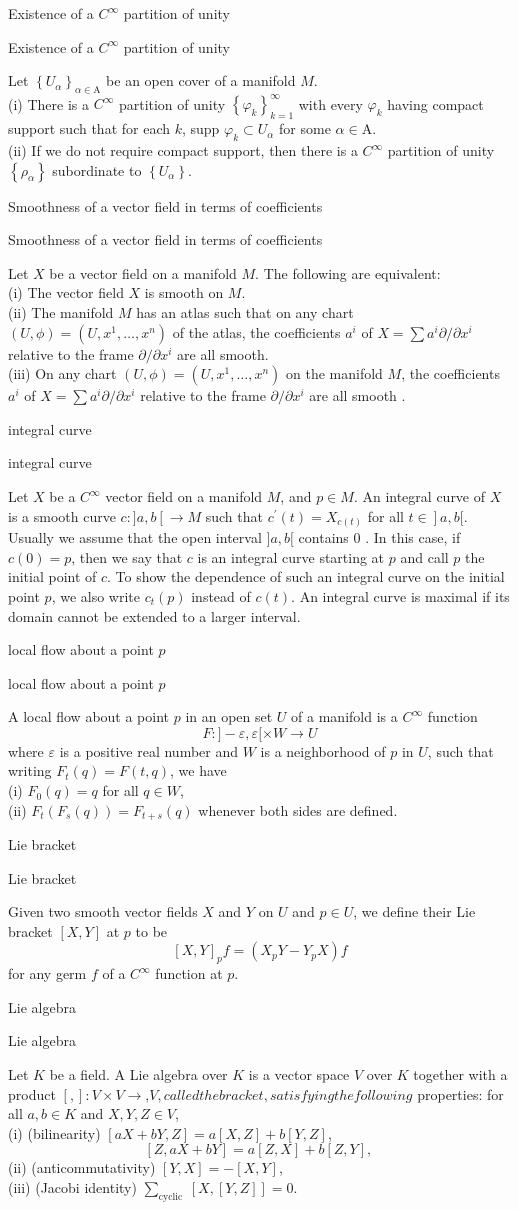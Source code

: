 \documentclass[17pt]{extarticle}
\newcommand{\boxset}[2]{\begin{mdframed}[style=darkQuesion]
#1
\end{mdframed}
\newpage
\begin{mdframed}[style=darkQuesion]
  #1
    \end{mdframed}
\begin{mdframed}[style=darkAnswer]
  #2
    \end{mdframed}
    \newpage
}
\begin{document}
\boxset{Existence of a $C^{\infty}$ partition of unity}
{Let $\left\{U_{\alpha}\right\}_{\alpha \in \mathrm{A}}$ be an open cover of a manifold $M$.\[\ \]
(i) There is a $C^{\infty}$ partition of unity $\left\{\varphi_{k}\right\}_{k=1}^{\infty}$ with every $\varphi_{k}$ having compact support such that for each $k$, supp $\varphi_{k} \subset U_{\alpha}$ for some $\alpha \in \mathrm{A}$.\[\ \]
(ii) If we do not require compact support, then there is a $C^{\infty}$ partition of unity $\left\{\rho_{\alpha}\right\}$ subordinate to $\left\{U_{\alpha}\right\}$.}
\boxset{Smoothness of a vector field in terms of coefficients}
{Let $X$ be a vector field on a manifold $M$. The following are equivalent:\[\ \]
(i) The vector field $X$ is smooth on $M$.\[\ \]
(ii) The manifold $M$ has an atlas such that on any chart $(U, \phi)=\left(U, x^{1}, \ldots, x^{n}\right)$ of the atlas, the coefficients $a^{i}$ of $X=\sum a^{i} \partial / \partial x^{i}$ relative to the frame $\partial / \partial x^{i}$ are all smooth.\[\ \]
(iii) On any chart $(U, \phi)=\left(U, x^{1}, \ldots, x^{n}\right)$ on the manifold $M$, the coefficients $a^{i}$ of $X=\sum a^{i} \partial / \partial x^{i}$ relative to the frame $\partial / \partial x^{i}$ are all smooth .}
\boxset{integral curve}
{Let $X$ be a $C^{\infty}$ vector field on a manifold $M$, and $p \in M$. An integral curve of $X$ is a smooth curve $c:] a, b\left[\rightarrow M\right.$ such that $c^{\prime}(t)=X_{c(t)}$ for all $\left.t \in\right] a, b[$. Usually we assume that the open interval $] a, b[$ contains 0 . In this case, if $c(0)=p$, then we say that $c$ is an integral curve starting at $p$ and call $p$ the initial point of $c$. To show the dependence of such an integral curve on the initial point $p$, we also write $c_{t}(p)$ instead of $c(t)$. An integral curve is maximal if its domain cannot be extended to a larger interval.}
\boxset{local flow about a point $p$}
{A local flow about a point $p$ in an open set $U$ of a manifold is a $C^{\infty}$ function
\[F:]-\varepsilon, \varepsilon[\times W \rightarrow U\]
where $\varepsilon$ is a positive real number and $W$ is a neighborhood of $p$ in $U$, such that writing $F_{t}(q)=F(t, q)$, we have\[\ \]
(i) $F_{0}(q)=q$ for all $q \in W$,\[\ \]
(ii) $F_{t}\left(F_{s}(q)\right)=F_{t+s}(q)$ whenever both sides are defined.}
\boxset{Lie bracket}
{Given two smooth vector fields $X$ and $Y$ on $U$ and $p \in U$, we define their Lie bracket $[X, Y]$ at $p$ to be
\[[X, Y]_{p} f=\left(X_{p} Y-Y_{p} X\right) f\]
for any germ $f$ of a $C^{\infty}$ function at $p$. }
\boxset{Lie algebra}
{Let $K$ be a field. A Lie algebra over $K$ is a vector space $V$ over $K$ together with a product $[,]: V \times V \rightarrow$,$V , called the bracket, satisfying the following$ properties: for all $a, b \in K$ and $X, Y, Z \in V$,\[\ \]
(i) (bilinearity) $[a X+b Y, Z]=a[X, Z]+b[Y, Z]$,\[[Z, a X+b Y]=a[Z, X]+b[Z, Y] \text {, }\]
(ii) (anticommutativity) $[Y, X]=-[X, Y]$,\[\ \]
(iii) (Jacobi identity) $\sum_{\text {cyclic }}[X,[Y, Z]]=0$.\[\ \]}
\end{document}

